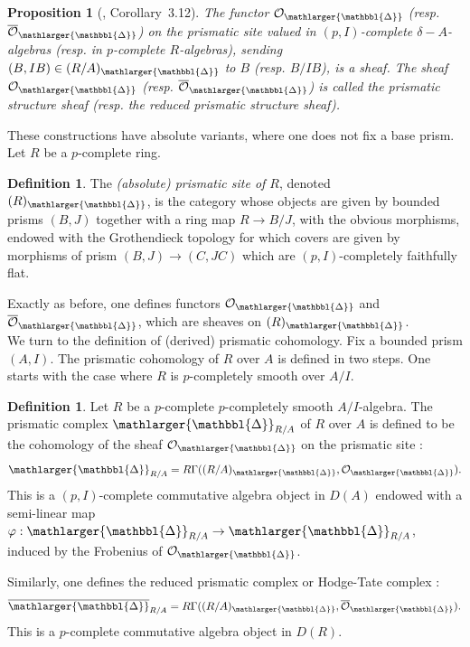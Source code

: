 \documentclass{amsart}
\newcommand{\prism}{{\mathlarger{\mathbbl{\Delta}}}}
\theoremstyle{plain}
\newtheorem{proposition}[theorem]{Proposition}
\theoremstyle{definition}
\newtheorem{definition}[theorem]{Definition}
\begin{document}
\begin{proposition}[\cite{bhatt_scholze_prisms_and_prismatic_cohomology}, Corollary\ 3.12]
\label{sec:prism-structure-sheaf}
The functor $\mathcal{O}_{\prism}$ (resp.\ $\overline{\mathcal{O}}_{\prism}$) on the prismatic site valued in $(p,I)$-complete $\delta-A$-algebras (resp. in $p$-complete $R$-algebras), sending $(B,IB) \in (R/A)_{\prism}$ to $B$ (resp. $B/IB$), is a sheaf. The sheaf $\mathcal{O}_{\prism}$ (resp. $\overline{\mathcal{O}}_{\prism}$) is called the \textit{prismatic structure sheaf} (resp. the \textit{reduced prismatic structure sheaf}). 
\end{proposition}

These constructions have absolute variants, where one does not fix a base prism. Let $R$ be a $p$-complete ring.

\begin{definition}
\label{sec:absolute:prismatic-site}
The \textit{(absolute) prismatic site of $R$}, denoted $(R)_{\prism}$, is the category whose objects are given by bounded prisms $(B,J)$ together with a ring map $R \to B/J$, with the obvious morphisms, endowed with the Grothendieck topology for which covers are given by morphisms of prism $(B,J) \to (C,JC)$ which are $(p,I)$-completely faithfully flat. 
\end{definition}

Exactly as before, one defines functors $\mathcal{O}_{\prism}$ and $\overline{\mathcal{O}}_{\prism}$, which are sheaves on $(R)_{\prism}$. 
\\

We turn to the definition of (derived) prismatic cohomology. Fix a bounded prism $(A,I)$. The prismatic cohomology of $R$ over $A$ is defined in two steps. One starts with the case where $R$ is $p$-completely smooth over $A/I$. 

\begin{definition}
\label{sec:def-prism-cohom-smooth} Let $R$ be a $p$-complete $p$-completely smooth $A/I$-algebra. The prismatic complex $\prism_{R/A}$ of $R$ over $A$ is defined to be the cohomology of the sheaf $\mathcal{O}_{\prism}$ on the prismatic site :
\[ \prism_{R/A} = R\Gamma((R/A)_{\prism}, \mathcal{O}_{\prism}). \]
This is a $(p,I)$-complete commutative algebra object in $D(A)$ endowed with a semi-linear map $\varphi : \prism_{R/A} \to \prism_{R/A}$, induced by the Frobenius of $\mathcal{O}_{\prism}$. 

Similarly, one defines the reduced prismatic complex or Hodge-Tate complex :
\[ \overline{\prism}_{R/A} = R\Gamma((R/A)_{\prism}, \overline{\mathcal{O}}_{\prism}). \]
This is a $p$-complete commutative algebra object in $D(R)$. 
\end{definition}
\end{document}
